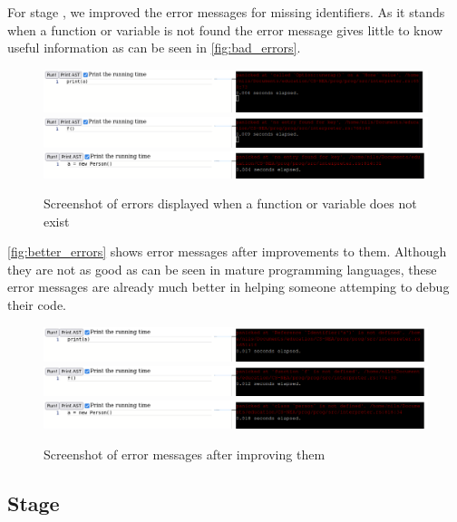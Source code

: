 \documentclass{article}
\newcommand{\subsecnum}{\the\value{subsection}}
\begin{document}
For stage \subsecnum, we improved the error messages for missing identifiers.
As it stands when a function or variable is not found the error message gives
little to know useful information as can be seen in \autoref{fig:bad_errors}.

\begin{figure}
	\includegraphics[width=\textwidth]{before_novar}
	\includegraphics[width=\textwidth]{before_nofunc}
	\includegraphics[width=\textwidth]{before_noclass}
	\caption{Screenshot of errors displayed when a function or variable does
	not exist}
	\label{fig:bad_errors}
\end{figure}

\autoref{fig:better_errors} shows error messages after improvements to them.
Although they are not as good as can be seen in mature programming languages,
these error messages are already much better in helping someone attemping to
debug their code.

\begin{figure}
	\includegraphics[width=\textwidth]{after_novar}
	\includegraphics[width=\textwidth]{after_nofunc}
	\includegraphics[width=\textwidth]{after_noclass}
	\caption{Screenshot of error messages after improving them}
	\label{fig:better_errors}
\end{figure}

\subsection{Stage \subsecnum}
\end{document}
